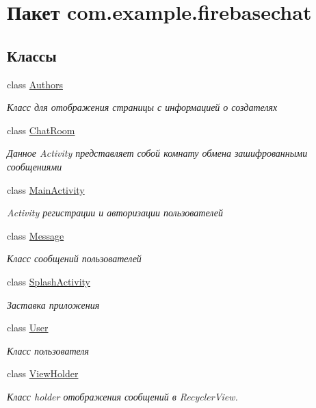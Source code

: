 \hypertarget{namespacecom_1_1example_1_1firebasechat}{}\section{Пакет com.\+example.\+firebasechat}
\label{namespacecom_1_1example_1_1firebasechat}
\subsection*{Классы}
\begin{DoxyCompactItemize}
\item 
class \mbox{\hyperlink{classcom_1_1example_1_1firebasechat_1_1_authors}{Authors}}
\begin{DoxyCompactList}\small\item\em Класс для отображения страницы с информацией о создателях \end{DoxyCompactList}\item 
class \mbox{\hyperlink{classcom_1_1example_1_1firebasechat_1_1_chat_room}{Chat\+Room}}
\begin{DoxyCompactList}\small\item\em Данное Activity представляет собой комнату обмена зашифрованными сообщениями \end{DoxyCompactList}\item 
class \mbox{\hyperlink{classcom_1_1example_1_1firebasechat_1_1_main_activity}{Main\+Activity}}
\begin{DoxyCompactList}\small\item\em Activity регистрации и авторизации пользователей \end{DoxyCompactList}\item 
class \mbox{\hyperlink{classcom_1_1example_1_1firebasechat_1_1_message}{Message}}
\begin{DoxyCompactList}\small\item\em Класс сообщений пользователей \end{DoxyCompactList}\item 
class \mbox{\hyperlink{classcom_1_1example_1_1firebasechat_1_1_splash_activity}{Splash\+Activity}}
\begin{DoxyCompactList}\small\item\em Заставка приложения \end{DoxyCompactList}\item 
class \mbox{\hyperlink{classcom_1_1example_1_1firebasechat_1_1_user}{User}}
\begin{DoxyCompactList}\small\item\em Класс пользователя \end{DoxyCompactList}\item 
class \mbox{\hyperlink{classcom_1_1example_1_1firebasechat_1_1_view_holder}{View\+Holder}}
\begin{DoxyCompactList}\small\item\em Класс holder отображения сообщений в Recycler\+View. \end{DoxyCompactList}\end{DoxyCompactItemize}
